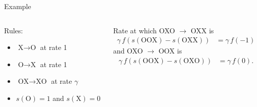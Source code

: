 \documentclass[smaller]{beamer}
\begin{document}
\begin{frame}{Example}

  \begin{columns}[c]
    \begin{column}{.5\textwidth}
  Rules:
  \begin{itemize}
    \item $\text{X} \to \text{O}$ at rate 1
    \item $\text{O} \to \text{X}$ at rate 1
    \item $\text{OX} \to \text{XO}$ at rate $\gamma$
    \item $s(\text{O}) = 1$ and $s(\text{X}) = 0$
  \end{itemize}

    \end{column}
    \begin{column}{.5\textwidth}

      Rate at which OXO $\to$ OXX is
      \begin{align*}
      \gamma \, f( s(\text{OOX}) - s(\text{OXX}) ) &= \gamma \, f( -1 ) 
      \end{align*}
      and OXO $\to$ OOX is
      \begin{align*}
      \gamma \, f( s(\text{OOX}) - s(\text{OXO}) ) &= \gamma \, f( 0 ) .
      \end{align*}

    \end{column}
  \end{columns}


\end{frame}
\end{document}
